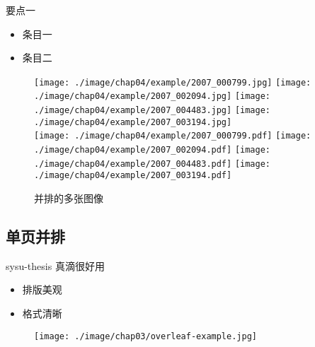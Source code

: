 \documentclass[
    fontset=fandol,
    xcolor=x11names %
]{ctexbeamer}
\begin{document}
\begin{frame}

    \begin{block}{要点一}
        \begin{itemize}
            \item 条目一
            \item 条目二
        \end{itemize}
    \end{block}

    \begin{figure} %
        \texttt{[image: ./image/chap04/example/2007\_000799.jpg]}
        \texttt{[image: ./image/chap04/example/2007\_002094.jpg]}
        \texttt{[image: ./image/chap04/example/2007\_004483.jpg]}
        \texttt{[image: ./image/chap04/example/2007\_003194.jpg]}
        \\
        \texttt{[image: ./image/chap04/example/2007\_000799.pdf]}
        \texttt{[image: ./image/chap04/example/2007\_002094.pdf]}
        \texttt{[image: ./image/chap04/example/2007\_004483.pdf]}
        \texttt{[image: ./image/chap04/example/2007\_003194.pdf]}
        \caption{并排的多张图像}
        \label{fig:multi-image-example1}
    \end{figure}

\end{frame}

\subsection{单页并排}

\begin{frame}

    \begin{minipage}{.35\linewidth}
    \begin{block}{sysu-thesis 真滴很好用}
        \begin{itemize}
            \item 排版美观
            \item 格式清晰
        \end{itemize}
    \end{block}
    \end{minipage}\begin{minipage}{.6\linewidth}

    \begin{figure}
        \texttt{[image: ./image/chap03/overleaf-example.jpg]}
    \end{figure}

    \end{minipage}

\end{frame}
\end{document}

